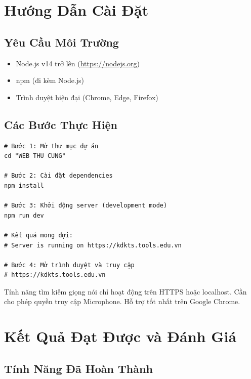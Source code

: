 \documentclass[12pt, a4paper]{report}
\begin{document}
\chapter{Hướng Dẫn Cài Đặt}

\section{Yêu Cầu Môi Trường}

\begin{itemize}
    \item Node.js v14 trở lên (\url{https://nodejs.org})
    \item npm (đi kèm Node.js)
    \item Trình duyệt hiện đại (Chrome, Edge, Firefox)
\end{itemize}

\section{Các Bước Thực Hiện}

\begin{lstlisting}[style=jsStyle, caption={Lệnh cài đặt và khởi chạy}]
# Bước 1: Mở thư mục dự án
cd "WEB THU CUNG"

# Bước 2: Cài đặt dependencies
npm install

# Bước 3: Khởi động server (development mode)
npm run dev

# Kết quả mong đợi:
# Server is running on https://kdkts.tools.edu.vn

# Bước 4: Mở trình duyệt và truy cập
# https://kdkts.tools.edu.vn
\end{lstlisting}

\begin{warningbox}
Tính năng tìm kiếm giọng nói chỉ hoạt động trên HTTPS hoặc localhost. Cần cho phép quyền truy cập Microphone. Hỗ trợ tốt nhất trên Google Chrome.
\end{warningbox}

\chapter{Kết Quả Đạt Được và Đánh Giá}

\section{Tính Năng Đã Hoàn Thành}
\end{document}
